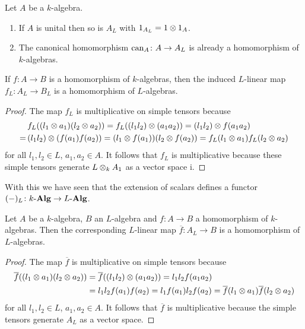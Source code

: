 \begin{remark}
  Let $A$ be a $k$-algebra.
  \begin{enumerate}
    \item
    If $A$ is unital then so is $A_L$ with $1_{A_L} = 1 \mathbin{\otimes} 1_A$.
    \item
    The canonical homomorphism $\operatorname{can}_A \colon A \to A_L$ is already a homomorphism of $k$-algebras.
  \end{enumerate}
\end{remark}


\begin{lemma}
  If $f \colon A \to B$ is a homomorphism of $k$-algebras, then the induced $L$-linear map $f_L \colon A_L \to B_L$ is a homomorphism of $L$-algebras.
\end{lemma}
\begin{proof}
  The map $f_L$ is multiplicative on simple tensors because
  \begin{align*}
     &\,  f_L((l_1 \mathbin{\otimes} a_1)(l_2 \mathbin{\otimes} a_2))
    =     f_L((l_1 l_2) \mathbin{\otimes} (a_1 a_2))
    =     (l_1 l_2) \mathbin{\otimes} f(a_1 a_2) \\
    =&\,  (l_1 l_2) \mathbin{\otimes} (f(a_1)f(a_2))
    =     (l_1 \mathbin{\otimes} f(a_1)) (l_2 \mathbin{\otimes} f(a_2))
    =     f_L(l_1 \mathbin{\otimes} a_1) f_L(l_2 \mathbin{\otimes} a_2)
  \end{align*}
  for all $l_1, l_2 \in L$, $a_1, a_2 \in A$.
  It follows that $f_L$ is multiplicative because these simple tensors generate $L \mathbin{\otimes}_k A_1$ as a vector space i.
\end{proof}
  
  
\begin{remark}
  With this we have seen that the extension of scalars defines a functor $(-)_L \colon k\text{-}\mathbf{Alg} \to L\text{-}\mathbf{Alg}$.
\end{remark}


\begin{lemma}
  \label{lemma: universal property of extension of scalars for algebras}
  Let $A$ be a $k$-algebra, $B$ an $L$-algebra and $f \colon A \to B$ a homomorphism of $k$-algebras.
  Then the corresponding $L$-linear map $\overline{f} \colon A_L \to B$ is a homomorphism of $L$-algebras.
  \begin{proof}
  The map $\overline{f}$ is multiplicative on simple tensors because
    \begin{align*}
          \overline{f}((l_1 \mathbin{\otimes} a_1)(l_2 \mathbin{\otimes} a_2))
      &=  \overline{f}((l_1 l_2) \mathbin{\otimes} (a_1 a_2))
       =  l_1 l_2 f(a_1 a_2)    \\
      &=  l_1 l_2 f(a_1) f(a_2)
       =  l_1 f(a_1) l_2 f(a_2)
       =  \overline{f}(l_1 \mathbin{\otimes} a_1) \overline{f}(l_2 \mathbin{\otimes} a_2)
    \end{align*}
    for all $l_1, l_2 \in L$, $a_1, a_2 \in A$.
    It follows that $\overline{f}$ is multiplicative because the simple tensors generate $A_L$ as a vector space.
  \end{proof}
\end{lemma}



